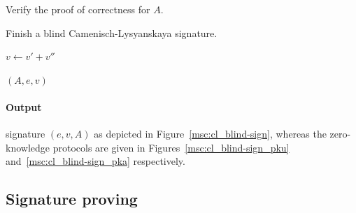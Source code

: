\begin{algorithm}
  \caption{Verify the proof of correctness for $A$.}
  \label{alg:CL-verify-A}
  \addtolength{\baselineskip}{1mm}
  \begin{algorithmic}[1]
      \If{}
        \Return {}
      \EndIf
      \Return {}
    \EndFunction
  \end{algorithmic}
\end{algorithm}

\begin{algorithm}
  \caption{Finish a blind Camenisch-Lysyanskaya signature.}
  \label{alg:CL-blind-finish}
  \addtolength{\baselineskip}{1mm}
  \begin{algorithmic}[1]
      \State $v \gets v' + v''$

      \Return $(A, e, v)$
    \EndFunction
  \end{algorithmic}
\end{algorithm}

\paragraph{Output} signature $(e, v, A)$ as depicted in Figure~\ref{msc:cl_blind-sign}, whereas the zero-knowledge protocols are given in Figures~\ref{msc:cl_blind-sign_pku} and~\ref{msc:cl_blind-sign_pka} respectively.



\subsection{Signature proving}\label{sec:cl_proof}


